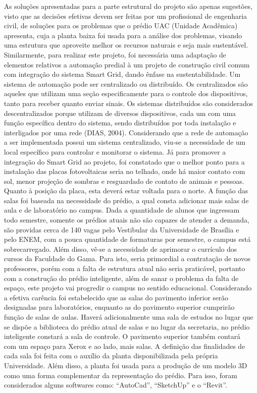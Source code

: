 As soluções apresentadas para a parte estrutural do projeto são apenas sugestões, visto que as decisões efetivas devem ser feitas por um profissional de engenharia civil, de soluções para os problemas que o prédio UAC (Unidade Acadêmica) apresenta, cuja a planta baixa foi usada para a análise dos problemas, visando uma estrutura que aproveite melhor os recursos naturais e seja mais sustentável.
Similarmente, para realizar este projeto, foi necessária uma adaptação de elementos relativos a automação predial à um projeto de construção civil comum com integração do sistema Smart Grid, dando ênfase na sustentabilidade. Um sistema de automação pode ser centralizado ou distribuído. Os centralizados são aqueles que utilizam uma seção especificamente para o controle dos dispositivos, tanto para receber quanto enviar sinais. Os sistemas distribuídos são considerados descentralizados porque utilizam de diversos dispositivos, cada um com uma função específica dentro do sistema, sendo distribuídos por toda instalação e interligados por uma rede (DIAS, 2004).
Considerando que a rede de automação a ser implementada possui um sistema centralizado, viu-se a necessidade de um local específico para controlar e monitorar o sistema. Já para promover a integração do Smart Grid ao projeto, foi constatado que o melhor ponto para a instalação das placas fotovoltaicas seria no telhado, onde há maior contato com sol, menor projeção de sombras e resguardado de contato de animais e pessoas. Quanto à posição da placa, esta deverá estar voltada para o norte.
A função das salas foi baseada na necessidade do prédio, a qual consta adicionar mais salas de aula e de laboratório no campus. Dada a quantidade de alunos que ingressam todo semestre, somente os prédios atuais não são capazes de atender a demanda, são providas cerca de 140 vagas pelo Vestibular da Universidade de Brasília e pelo ENEM, com a pouca quantidade de formaturas por semestre, o campus está sobrecarregado.
Além disso, vê-se a necessidade de aprimorar o currículo dos cursos da Faculdade do Gama. Para isto, seria primordial a contratação de novos professores, porém com a falta de estrutura atual não seria praticável, portanto com a construção do prédio inteligente, além de sanar o problema da falta de espaço, este projeto vai progredir o campus no sentido educacional.
Considerando a efetiva carência foi estabelecido que as salas do pavimento inferior serão designadas para laboratórios, enquanto as do pavimento superior cumprirão função de salas de aulas. Haverá adicionalmente uma sala de estudos no lugar que se dispõe a biblioteca do prédio atual de salas e no lugar da secretaria, no prédio inteligente constará a sala de controle. O pavimento superior também contará com um espaço para Xerox e ao lado, mais salas.
A definição das finalidades de cada sala foi feita com o auxílio da planta disponibilizada pela própria Universidade. Além disso, a planta foi usada para a produção de um modelo 3D como uma forma complementar da representação do prédio. Para isso, foram considerados alguns softwares como: “AutoCad”, “SketchUp” e o “Revit”.

